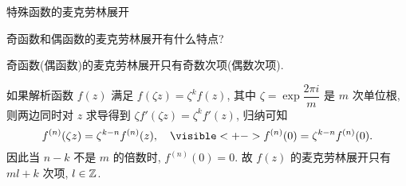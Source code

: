 \begin{frame}{特殊函数的麦克劳林展开}
\begin{think}
奇函数和偶函数的麦克劳林展开有什么特点?
\end{think}
\begin{answer}
奇函数(偶函数)的麦克劳林展开只有奇数次项(偶数次项).

\onslide<+->
如果解析函数 $f(z)$ 满足 $f(\zeta z)=\zeta^k f(z)$, 其中 $\zeta=\exp\dfrac{2\pi i}m$ 是 $m$ 次单位根,
\onslide<+->
则两边同时对 $z$ 求导得到 $\zeta f'(\zeta z)=\zeta^k f'(z)$,
\onslide<+->
归纳可知
\[f^{(n)}(\zeta z)=\zeta^{k-n}f^{(n)}(z),
\quad\visible<+->{f^{(n)}(0)=\zeta^{k-n}f^{(n)}(0).}\]
\onslide<+->
因此当 $n-k$ 不是 $m$ 的倍数时, $f^{(n)}(0)=0$.
\onslide<+->
故 $f(z)$ 的麦克劳林展开只有 $ml+k$ 次项, $l\in{\mathbb{Z}}$.
\end{answer}
\end{frame}
